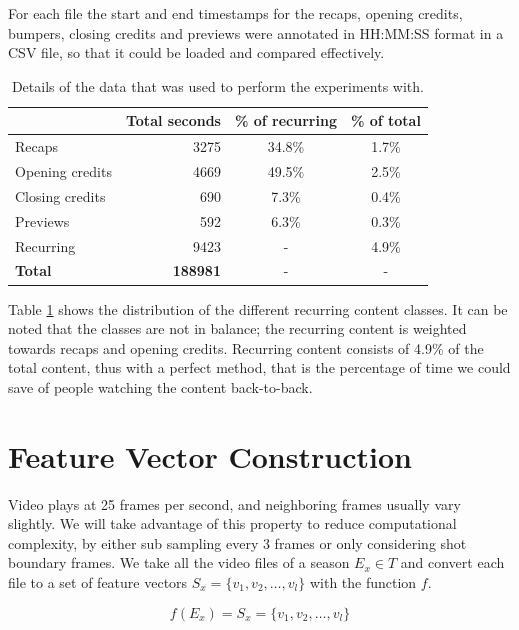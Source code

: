 \documentclass{report}
\begin{document}
For each file the start and end timestamps for the recaps, opening credits, bumpers, closing credits and previews were annotated in HH:MM:SS format in a CSV file, so that it could be loaded and compared effectively.

\begin{table}[h]
	\begin{adjustwidth}{-.5in}{-.5in}  
		\begin{center}
			\begin{tabular}{ l | r c c}
								& Total seconds & \% of recurring 	& \% of total \\
				\hline
				Recaps 			& 3275 			& 34.8\% 			& 1.7\% \\
				Opening credits	& 4669			& 49.5\%			& 2.5\%	\\
				Closing credits	& 690			& 7.3\%				& 0.4\%	\\
				Previews		& 592			& 6.3\%				& 0.3\% \\
				\hline
				Recurring		& 9423			& -					& 4.9\% \\
				\textbf{Total}	& \textbf{188981}		& -					& -
			\end{tabular}
		\end{center}
	\end{adjustwidth}
	\caption{Details of the data that was used to perform the experiments with.}
	\label{table:datastatistics}
\end{table}

Table \ref{table:datastatistics} shows the distribution of the different recurring content classes. It can be noted that the classes are not in balance; the recurring content is weighted towards recaps and opening credits. Recurring content consists of 4.9\% of the total content, thus with a perfect method, that is the percentage of time we could save of people watching the content back-to-back.

\section{Feature Vector Construction}
Video plays at 25 frames per second, and neighboring frames usually vary slightly. We will take advantage of this property to reduce computational complexity, by either sub sampling every 3 frames or only considering shot boundary frames. We take all the video files of a season $E_x \in T$ and convert each file to a set of feature vectors $S_x = \{v_1, v_2, \dots, v_l\}$ with the function $f$.

\[f(E_x) = S_x = \{v_1, v_2, \dots, v_l\}\]
\end{document}
